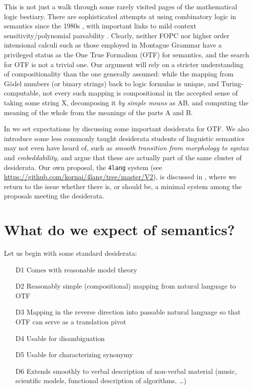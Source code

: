 \documentclass[output=paper,colorlinks=true,citecolor=brown]{langscibook}
\begin{document}
This is not just a walk through some rarely visited pages of the mathematical
logic bestiary. There are sophisticated attempts at using combinatory logic in
semantics since the 1980s \citep{Szabolcsi:1987,Steedman:1987,Jacobson:1999,Baldridge:2002}, with
important links to mild context sensitivity\slash polynomial parsability
\citep{Joshi:1990}. Clearly, neither FOPC nor higher order intensional calculi
such as those employed in Montague Grammar have a privileged status as the One True
Formalism (OTF) for semantics, and the search for OTF is not a trivial one. Our
argument will rely on a stricter understanding of compositionality than the
one generally assumed: while the mapping from Gödel numbers (or binary
strings) back to logic formulas is unique, and Turing-computable, not every
such mapping is compositional in the accepted sense of taking some string X,
decomposing it \textit{by simple means} as AB, and computing the meaning of
the whole from the meanings of the parts A and B. 

In  we set expectations by discussing some important
desiderata for OTF.  We also introduce some less commonly taught desiderata
students of linguistic semantics may not even have heard of, such as \textit{smooth transition from morphology to syntax} and \textit{embeddability}, and
argue that these are actually part of the same cluster of desiderata.  Our own
proposal, the \texttt{4lang} system (see \url{https://github.com/kornai/4lang/tree/master/V2}), is discussed in
, where we return to the issue whether there is, or should
be, a minimal system among the proposals meeting the desiderata.

\section{What do we expect of semantics?}\label{expect}

Let us begin with some standard desiderata: 

\begin{enumerate}
\item[D1] Comes with reasonable model theory
\item[D2] Reasonably simple (compositional) mapping from natural language to
  OTF
\item[D3] Mapping in the reverse direction into passable natural language so that
  OTF can serve as a translation pivot
\item[D4] Usable for disambiguation
\item[D5] Usable for characterizing synonymy
\item[D6] Extends smoothly to verbal description of non-verbal material (music,
  scientific models, functional description of algorithms, \ldots)
\end{enumerate}
\end{document}
